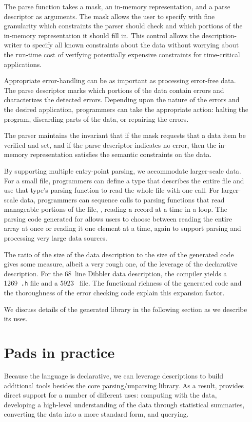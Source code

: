 \documentclass{sig-alternate}
\begin{document}
The parse function takes a mask, an
in-memory representation, and a parse descriptor as arguments.  
The mask allows the user to specify with fine granularity
which constraints the parser should check and which portions of the
in-memory representation it should fill in.  This control allows the
description-writer to specify all known constraints about the data
without worrying about the run-time cost of verifying potentially
expensive constraints for time-critical applications.

Appropriate error-handling can be as important as processing
error-free data.  The parse descriptor marks which portions of the
data contain errors and characterizes the detected errors.
Depending upon the nature of the errors and the desired application,
programmers can take the appropriate action: halting the program,
discarding parts of the data, or repairing the errors.

The parser maintains the invariant that if the mask requests
that a data item be verified and set, and if the parse descriptor
indicates no error, then the in-memory representation satisfies the
semantic constraints on the data.

By supporting multiple entry-point parsing, we accommodate larger-scale data.
For a small file, programmers can define a \pads{} type that describes
the entire file and use that type's parsing function to read the whole
file with one call.  For larger-scale data, programmers can sequence
calls to parsing functions that read manageable portions of the file,
\eg{}, reading a record at a time in a loop.  The parsing code generated
for  allows users to choose between reading the entire array
at once or reading it one element at a time, again to support parsing
and processing very large data sources.

The ratio of the size of the data description to the size of the generated code gives some measure, albeit a very rough one, of the leverage of the
declarative description.  For the 
68~line Dibbler data description, the compiler yields a 1269~\texttt{.h} file
and a 5923~ file.  The functional richness of the generated code and the thoroughness of the error checking code explain this expansion factor.

We discuss details of the generated library in the following section
as we describe its uses.

\section{Pads in practice}
Because the \pads{} language is declarative, we can leverage \pads{}
descriptions to build additional tools besides the core parsing/unparsing
library.  As a result, \pads{} provides direct support for a number
of different uses: computing with the data, developing a high-level
understanding of the data through statistical summaries, converting the data into a more standard form, and querying.  
\end{document}
